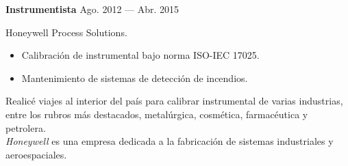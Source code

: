 \bigskip
\parbox[t][][t]{\linewidth}{
	{\parbox{\linewidth}{
		\parbox{\linewidth}{
			\textbf{Instrumentista}
			\hfill
			{Ago. 2012 --- Abr. 2015}
		}
	}}
	\smallbreak
	\parbox{\linewidth}{Honeywell Process Solutions.}
	\smallbreak
	\begin{itemize}
	    \item{Calibración de instrumental bajo norma ISO-IEC 17025.}
	    \item{Mantenimiento de sistemas de detección de incendios.}
	\end{itemize}
	\smallbreak
	Realicé viajes al interior del país para calibrar instrumental de varias industrias, entre los rubros más destacados, metalúrgica, cosmética, farmacéutica y petrolera.\\
    \emph{Honeywell} es una empresa dedicada a la fabricación de sistemas industriales y aeroespaciales.
}

